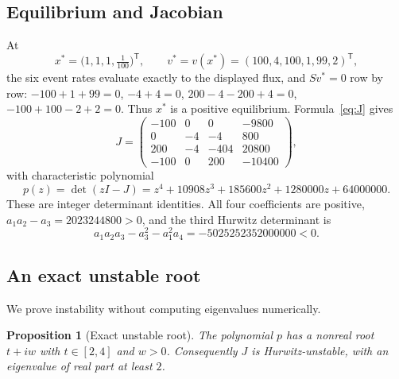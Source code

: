\documentclass[11pt,a4paper]{article}
\theoremstyle{plain}
\newtheorem{proposition}[theorem]{Proposition}
\theoremstyle{definition}
\theoremstyle{remark}
\newcommand{\xs}{x^{*}}
\newcommand{\vs}{v^{*}}
\begin{document}
\subsection{Equilibrium and Jacobian}

At
\begin{equation}\label{eq:state}
\xs=\bigl(1,1,1,\tfrac1{100}\bigr)^{\mathsf T},\qquad
\vs=v(\xs)=(100,4,100,1,99,2)^{\mathsf T},
\end{equation}
the six event rates evaluate exactly to the displayed flux, and $S\vs=0$ row by row: $-100+1+99=0$, $-4+4=0$, $200-4-200+4=0$, $-100+100-2+2=0$. Thus $\xs$ is a positive equilibrium. Formula~\eqref{eq:J} gives
\begin{equation}\label{eq:jac}
J=\begin{pmatrix}
-100&0&0&-9800\\
0&-4&-4&800\\
200&-4&-404&20800\\
-100&0&200&-10400
\end{pmatrix},
\end{equation}
with characteristic polynomial
\begin{equation}\label{eq:charpoly}
p(z)=\det(zI-J)=z^4+10908z^3+185600z^2+1280000z+64000000 .
\end{equation}
These are integer determinant identities. All four coefficients are positive, $a_1a_2-a_3=2023244800>0$, and the third Hurwitz determinant is
\[
a_1a_2a_3-a_3^2-a_1^2a_4=-5025252352000000<0 .
\]

\subsection{An exact unstable root}

We prove instability without computing eigenvalues numerically.

\begin{proposition}[Exact unstable root]\label{prop:root}
The polynomial $p$ has a nonreal root $t+iw$ with $t\in[2,4]$ and $w>0$. Consequently $J$ is Hurwitz-unstable, with an eigenvalue of real part at least $2$.
\end{proposition}
\end{document}
